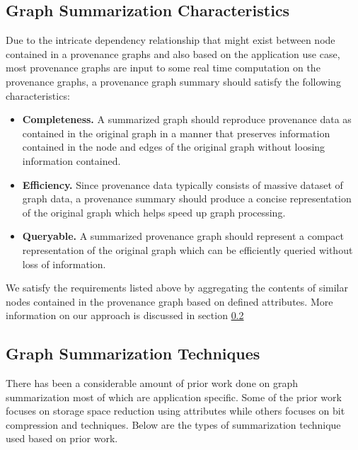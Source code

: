   
 
 \subsection{Graph Summarization Characteristics}

Due to the intricate dependency relationship that might exist between node contained in a provenance graphs and also based on the application use case, most provenance graphs are input to some real time computation on the provenance graphs, a provenance graph summary should satisfy the following characteristics:

\begin{itemize}
\item \textbf{Completeness.} A summarized graph should reproduce provenance data as contained in the original graph in a manner that preserves information contained in the node and edges of the original graph without loosing information contained. 

\item \textbf{Efficiency.} Since provenance data typically consists of massive dataset of graph data, a provenance summary should produce a concise representation of the original graph which helps speed up graph processing.  

\item \textbf{Queryable.}  A summarized provenance graph should represent a compact representation of the original graph which can be efficiently queried without loss of information.  

\end{itemize}

We satisfy the requirements listed above by aggregating the contents of similar nodes contained in the provenance graph based on defined attributes. More information on our approach is discussed in section \ref{}



\subsection{Graph Summarization Techniques}
 

There has been a considerable amount of prior work done on graph summarization \cite{grass, compressing_graph, Tian, Navlakha, hussain_secure_2014} most of which are application specific. Some of the prior work focuses on storage space reduction \cite{grass, Tian, Navlakha} using attributes while others focuses on bit compression \cite{compressing_graph, hussain_secure_2014} and  techniques. Below are the types of summarization technique used based on prior work.

